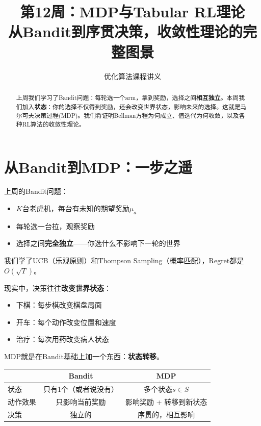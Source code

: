 \documentclass[11pt,a4paper]{article}
\title{\textbf{第12周：MDP与Tabular RL理论} \\[0.5em]
\large 从Bandit到序贯决策，收敛性理论的完整图景}
\author{优化算法课程讲义}
\date{}
\theoremstyle{definition}
\begin{document}
\maketitle

\begin{abstract}
上周我们学习了Bandit问题：每轮选一个arm，拿到奖励，选择之间\textbf{相互独立}。本周我们加入\textbf{状态}：你的选择不仅得到奖励，还会改变世界状态，影响未来的选择。这就是马尔可夫决策过程(MDP)。我们将证明Bellman方程为何成立、值迭代为何收敛，以及各种RL算法的收敛性理论。
\end{abstract}

\tableofcontents
\newpage

\section{从Bandit到MDP：一步之遥}

\begin{plainwords}[回顾上周]
上周的Bandit问题：
\begin{itemize}
    \item $K$台老虎机，每台有未知的期望奖励$\mu_a$
    \item 每轮选一台拉，观察奖励
    \item 选择之间\textbf{完全独立}——你选什么不影响下一轮的世界
\end{itemize}

我们学了UCB（乐观原则）和Thompson Sampling（概率匹配），Regret都是$O(\sqrt{T})$。
\end{plainwords}

\begin{plainwords}[本周的扩展]
现实中，决策往往\textbf{改变世界状态}：
\begin{itemize}
    \item 下棋：每步棋改变棋盘局面
    \item 开车：每个动作改变位置和速度  
    \item 治疗：每次用药改变病人状态
\end{itemize}

MDP就是在Bandit基础上加一个东西：\textbf{状态转移}。

\begin{center}
\begin{tabular}{l|c|c}
\toprule
& Bandit & MDP \\
\midrule
状态 & 只有1个（或者说没有） & 多个状态$s \in S$ \\
动作效果 & 只影响当前奖励 & 影响奖励 + 转移到新状态 \\
决策 & 独立的 & 序贯的，相互影响 \\
\bottomrule
\end{tabular}
\end{center}
\end{plainwords}
\end{document}
